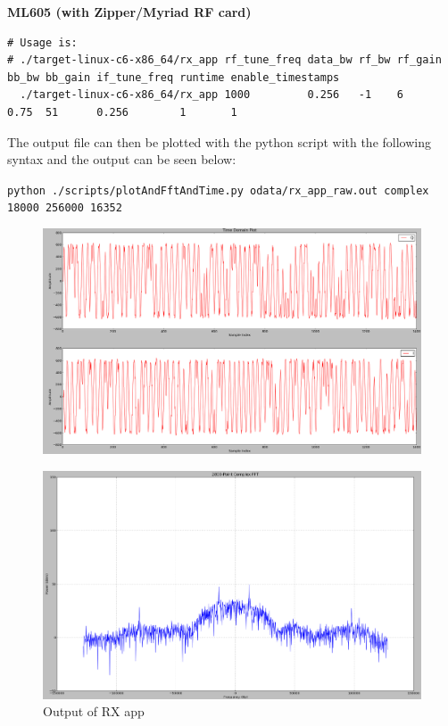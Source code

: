 \documentclass{article}
\begin{document}
\noindent\textbf{ML605 (with Zipper/Myriad RF card)}\\
\scriptsize
\noindent
\begin{verbatim}
# Usage is:
# ./target-linux-c6-x86_64/rx_app rf_tune_freq data_bw rf_bw rf_gain bb_bw bb_gain if_tune_freq runtime enable_timestamps
  ./target-linux-c6-x86_64/rx_app 1000         0.256   -1    6       0.75  51      0.256        1       1
\end{verbatim}
\small
\par\medskip
\noindent The output file can then be plotted with the python script with the following syntax and the output can be seen below:\par\medskip
\noindent\texttt{python ./scripts/plotAndFftAndTime.py odata/rx\_app\_raw.out complex 18000 256000 16352}\par
	\begin{figure}[h]
	 	\centering
		\includegraphics[scale=.2]{rx_app_iq_plot}
		\label{fig:rx_app_iq_plot}
	\end{figure}
	\begin{figure}[h]
	 	\centering
		\includegraphics[scale=.2]{rx_app_fft_plot}
		\caption{Output of RX app}
		\label{fig:rx_app_fft_plot}
	\end{figure}
\end{document}
